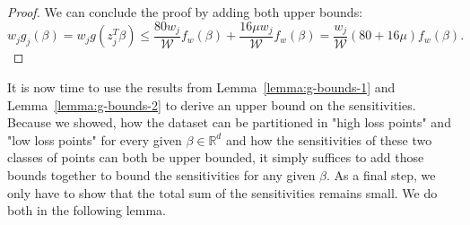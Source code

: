 \begin{proof}
    We can conclude the proof by adding both upper bounds:
    \begin{equation*}
        w_j g_j(\beta)
        = w_j g(z_j^T \beta) \leq \frac{80 w_j}{\mathcal{W}} f_w(\beta)
        + \frac{16 \mu w_j}{\mathcal{W}} f_w(\beta)
        = \frac{w_j}{\mathcal{W}} (80 + 16 \mu) f_w(\beta).
    \end{equation*}
\end{proof}

It is now time to use the results from Lemma~\ref{lemma:g-bounds-1}
and Lemma~\ref{lemma:g-bounds-2} to derive an upper bound on
the sensitivities. Because we showed, how the dataset can
be partitioned in "high loss points" and "low loss points"
for every given $\beta \in \mathbb{R}^d$
and how the sensitivities of these two classes of points
can both be upper bounded, it simply suffices to add those
bounds together to bound the sensitivities for any given $\beta$.
As a final step, we only have to show that the total sum of the
sensitivities remains small. We do both in the following lemma.

